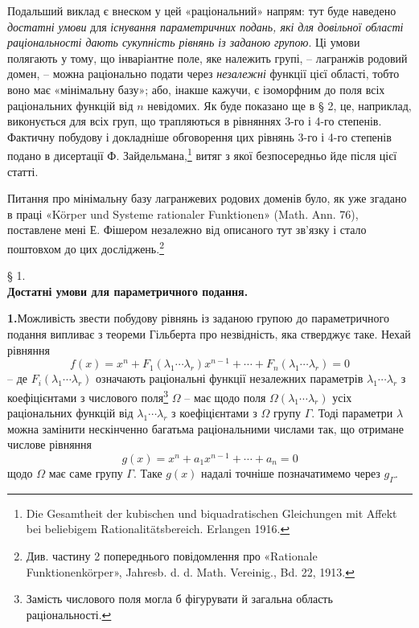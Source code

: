 \documentclass[11pt]{article}
\begin{document}
Подальший виклад є внеском у цей «раціональний» напрям: тут буде наведено \emph{достатні умови} для \emph{існування параметричних подань, які для довільної області раціональності дають сукупність рівнянь із заданою групою}. Ці умови полягають у тому, що інваріантне поле, яке належить групі, -- лагранжів родовий домен, -- можна раціонально подати через \emph{незалежні} функції цієї області, тобто воно має «мінімальну базу»; або, інакше кажучи, є ізоморфним до поля всіх раціональних функцій від $n$ невідомих. Як буде показано ще в § 2, це, наприклад, виконується для всіх груп, що трапляються в рівняннях 3-го і 4-го степенів. Фактичну побудову і докладніше обговорення цих рівнянь 3-го і 4-го степенів подано в дисертації Ф. Зайдельмана,\footnote{Die Gesamtheit der kubischen und biquadratischen Gleichungen mit Affekt bei beliebigem Rationalitätsbereich. Erlangen 1916.} витяг з якої безпосередньо йде після цієї статті.

Питання про мінімальну базу лагранжевих родових доменів було, як уже згадано в праці «Körper und Systeme rationaler Funktionen» (Math. Ann. 76), поставлене мені Е. Фішером незалежно від описаного тут зв'язку і стало поштовхом до цих досліджень.\footnote{Див. частину 2 попереднього повідомлення про «Rationale Funktionenkörper», Jahresb. d. d. Math. Vereinig., Bd. 22, 1913.}

\begin{center}
§ 1.\\[0.75\baselineskip]
\textbf{Достатні умови для параметричного подання.}
\end{center}

\noindent\textbf{1.}\quad Можливість звести побудову рівнянь із заданою групою до параметричного подання випливає з теореми Гільберта про незвідність, яка стверджує таке. Нехай рівняння
\begin{equation}
 f(x)=x^n+F_1(\lambda_1\cdots\lambda_r)x^{n-1}+\cdots+F_n(\lambda_1\cdots\lambda_r)=0
\tag{1}
\end{equation}
-- де $F_i(\lambda_1\cdots\lambda_r)$ означають раціональні функції незалежних параметрів $\lambda_1\cdots\lambda_r$ з коефіцієнтами з числового поля\footnote{Замість числового поля могла б фігурувати й загальна область раціональності.} $\Omega$ -- має щодо поля $\Omega(\lambda_1\cdots\lambda_r)$ усіх раціональних функцій від $\lambda_1\cdots\lambda_r$ з коефіцієнтами з $\Omega$ групу $\Gamma$. Тоді параметри $\lambda$ можна замінити нескінченно багатьма раціональними числами так, що отримане числове рівняння
\begin{equation}
 g(x)=x^n+a_1x^{n-1}+\cdots+a_n=0
\tag{2}
\end{equation}
щодо $\Omega$ має саме групу $\Gamma$. Таке $g(x)$ надалі точніше позначатимемо через $g_\Gamma$.
\end{document}
